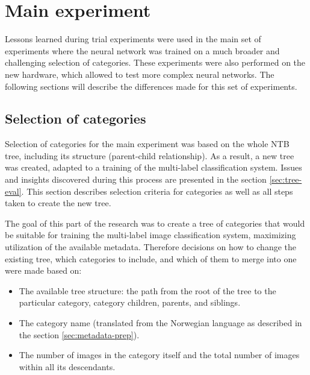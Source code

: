 \section{Main experiment}
    Lessons learned during trial experiments were used in the main set of experiments where the neural network was trained on a much broader and challenging selection of categories. These experiments were also performed on the new hardware, which allowed to test more complex neural networks. The following sections will describe the differences made for this set of experiments.
    
    \subsection{Selection of categories}
    \label{sec:main-cat-selection}
    Selection of categories for the main experiment was based on the whole NTB tree, including its structure (parent-child relationship). As a result, a new tree was created, adapted to a training of the multi-label classification system. Issues and insights discovered during this process are presented in the section \ref{sec:tree-eval}. This section describes selection criteria for categories as well as all steps taken to create the new tree.
    
    The goal of this part of the research was to create a tree of categories that would be suitable for training the multi-label image classification system, maximizing utilization of the available metadata. Therefore decisions on how to change the existing tree, which categories to include, and which of them to merge into one were made based on:
    
    \begin{itemize}
        \item The available tree structure: the path from the root of the tree to the particular category, category children, parents, and siblings.
        \item The category name (translated from the Norwegian language as described in the section \ref{sec:metadata-prep}).
        \item The number of images in the category itself and the total number of images within all its descendants.
    \end{itemize}
    
